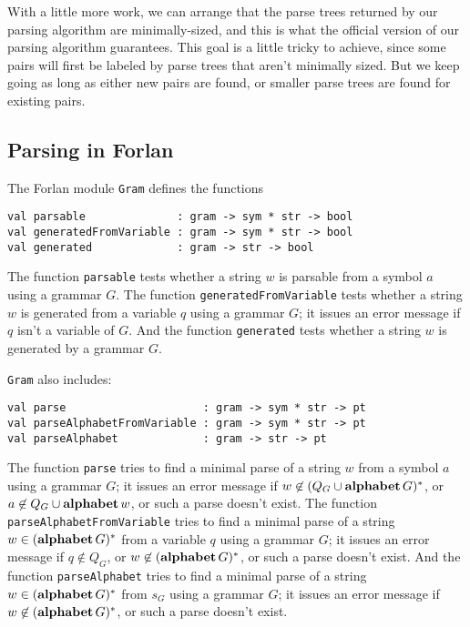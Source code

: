 With a little more work, we can arrange that the parse trees returned
by our parsing algorithm are minimally-sized, and this is what the
official version of our parsing algorithm guarantees.  This goal is a
little tricky to achieve, since some pairs will first be labeled by
parse trees that aren't minimally sized. But we keep going as long as
either new pairs are found, or smaller parse trees are found for
existing pairs.

\subsection{Parsing in Forlan}

The Forlan module \texttt{Gram} defines the functions
\begin{verbatim}
val parsable              : gram -> sym * str -> bool
val generatedFromVariable : gram -> sym * str -> bool
val generated             : gram -> str -> bool
\end{verbatim}
%
%
%
The function \texttt{parsable} tests whether a string $w$ is parsable
from a symbol $a$ using a grammar $G$.  The function
\texttt{generatedFromVariable} tests whether a string $w$ is generated
from a variable $q$ using a grammar $G$; it issues an error message if
$q$ isn't a variable of $G$.  And the function \texttt{generated}
tests whether a string $w$ is generated by a grammar $G$.

\texttt{Gram} also includes:
\begin{verbatim}
val parse                     : gram -> sym * str -> pt
val parseAlphabetFromVariable : gram -> sym * str -> pt
val parseAlphabet             : gram -> str -> pt
\end{verbatim}
%
%
%
The function \texttt{parse} tries to find a minimal parse of a string
$w$ from a symbol $a$ using a grammar $G$; it issues an error message
if $w\not\in(Q_G\cup\mathbf{alphabet}\,G)^*$, or $a\not\in
Q_G\cup\mathbf{alphabet}\,w$, or such a parse doesn't exist.  The function
\texttt{parseAlphabetFromVariable} tries to find a minimal parse of a
string $w\in(\mathbf{alphabet}\,G)^*$ from a variable $q$ using a grammar $G$;
it issues an error message if $q\not\in Q_G$, or
$w\not\in(\mathbf{alphabet}\,G)^*$, or such a parse doesn't exist.  And the
function \texttt{parseAlphabet} tries to find a minimal parse of a
string $w\in(\mathbf{alphabet}\,G)^*$ from $s_G$ using a grammar $G$; it
issues an error message if $w\not\in(\mathbf{alphabet}\,G)^*$, or such a parse
doesn't exist.

